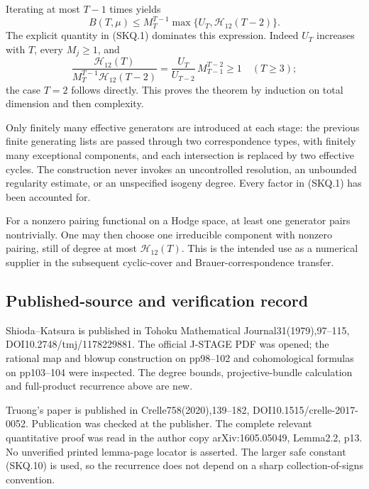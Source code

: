 Iterating at most \(T-1\) times yields \[
 B(T,\mu)\le
 M_T^{T-1}\max\{U_T,\mathcal H_{12}(T-2)\}.
 \tag{SKQ.14}
\] The explicit quantity in (SKQ.1) dominates this expression. Indeed
\(U_T\) increases with \(T\), every \(M_j\ge1\), and \[
 \frac{\mathcal H_{12}(T)}
      {M_T^{T-1}\mathcal H_{12}(T-2)}
 =
 \frac{U_T}{U_{T-2}}\,M_{T-1}^{T-2}\ge1
 \quad(T\ge3);
\] the case \(T=2\) follows directly. This proves the theorem by
induction on total dimension and then complexity.

Only finitely many effective generators are introduced at each stage:
the previous finite generating lists are passed through two
correspondence types, with finitely many exceptional components, and
each intersection is replaced by two effective cycles. The construction
never invokes an uncontrolled resolution, an unbounded regularity
estimate, or an unspecified isogeny degree. Every factor in (SKQ.1) has
been accounted for.

For a nonzero pairing functional on a Hodge space, at least one
generator pairs nontrivially. One may then choose one irreducible
component with nonzero pairing, still of degree at most
\(\mathcal H_{12}(T)\). This is the intended use as a numerical supplier
in the subsequent cyclic-cover and Brauer-correspondence transfer.

\subsection{Published-source and verification
record}\label{published-source-and-verification-record}

Shioda--Katsura is published in Tohoku Mathematical
Journal31(1979),97--115, DOI10.2748/tmj/1178229881. The official J-STAGE
PDF was opened; the rational map and blowup construction on pp98--102
and cohomological formulas on pp103--104 were inspected. The degree
bounds, projective-bundle calculation and full-product recurrence above
are new.

Truong's paper is published in Crelle758(2020),139--182,
DOI10.1515/crelle-2017-0052. Publication was checked at the publisher.
The complete relevant quantitative proof was read in the author copy
arXiv:1605.05049, Lemma2.2, p13. No unverified printed lemma-page
locator is asserted. The larger safe constant (SKQ.10) is used, so the
recurrence does not depend on a sharp collection-of-signs convention.
